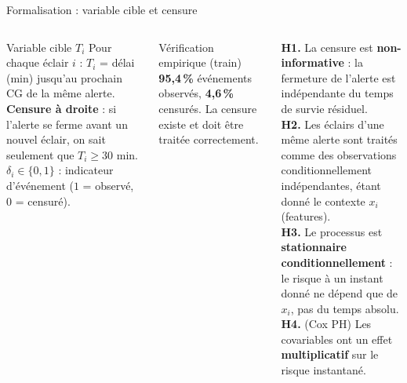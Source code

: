 \documentclass[aspectratio=169,t,11pt]{beamer}
\begin{document}
\begin{frame}{Formalisation : variable cible et censure}
\vspace{-2pt}
\begin{columns}[T]

\begin{block}{Variable cible $T_i$}
\footnotesize
Pour chaque éclair $i$ : $T_i$ = délai (min) jusqu'au prochain CG de la même alerte.\\[3pt]
\textbf{Censure à droite} : si l'alerte se ferme avant un nouvel
éclair, on sait seulement que $T_i \ge 30$ min.
$\delta_i \in \{0,1\}$ : indicateur d'événement ($1$ = observé, $0$ = censuré).
\end{block}
\vspace{2pt}
\begin{alertblock}{Vérification empirique (train)}
\footnotesize
\textbf{95,4\,\%} événements observés, \textbf{4,6\,\%} censurés.
La censure existe et doit être traitée correctement.
\end{alertblock}

\begin{tcolorbox}[mybox,colback=metMid!10,colframe=metMid,
  title={Hypothèses du modèle}]
\footnotesize
\textbf{H1.} La censure est \textbf{non-informative} : la fermeture
de l'alerte est indépendante du temps de survie résiduel.\\[3pt]
\textbf{H2.} Les éclairs d'une même alerte sont traités comme des
observations conditionnellement indépendantes, étant donné le
contexte $x_i$ (features).\\[3pt]
\textbf{H3.} Le processus est \textbf{stationnaire conditionnellement} :
le risque à un instant donné ne dépend que de $x_i$, pas du temps absolu.\\[3pt]
\textbf{H4.} (Cox PH) Les covariables ont un effet
\textbf{multiplicatif} sur le risque instantané.
\end{tcolorbox}
\end{columns}
\end{frame}
\end{document}
